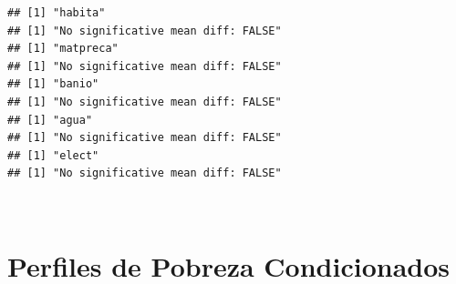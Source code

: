 \documentclass[
]{book}
\newenvironment{Shaded}{\begin{snugshade}}{\end{snugshade}}
\newcommand{\ControlFlowTok}[1]{\textcolor[rgb]{0.13,0.29,0.53}{\textbf{#1}}}
\newcommand{\DecValTok}[1]{\textcolor[rgb]{0.00,0.00,0.81}{#1}}
\newcommand{\FunctionTok}[1]{\textcolor[rgb]{0.00,0.00,0.00}{#1}}
\newcommand{\NormalTok}[1]{#1}
\newcommand{\OtherTok}[1]{\textcolor[rgb]{0.56,0.35,0.01}{#1}}
\newcommand{\SpecialCharTok}[1]{\textcolor[rgb]{0.00,0.00,0.00}{#1}}
\newcommand{\StringTok}[1]{\textcolor[rgb]{0.31,0.60,0.02}{#1}}
\begin{document}
\begin{Shaded}
\end{Shaded}

\begin{verbatim}
## [1] "habita"
## [1] "No significative mean diff: FALSE"
## [1] "matpreca"
## [1] "No significative mean diff: FALSE"
## [1] "banio"
## [1] "No significative mean diff: FALSE"
## [1] "agua"
## [1] "No significative mean diff: FALSE"
## [1] "elect"
## [1] "No significative mean diff: FALSE"
\end{verbatim}

~

\hypertarget{perfiles-de-pobreza-condicionados}{%
\section{Perfiles de Pobreza Condicionados}\label{perfiles-de-pobreza-condicionados}}
\end{document}
